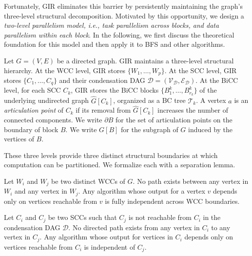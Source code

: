 Fortunately, GIR eliminates this barrier by persistently maintaining the graph's three-level structural decomposition.
Motivated by this opportunity, we design a \textit{{two-level parallelism model, i.e., task parallelism across blocks, and data parallelism within each block}}.
In the following, we first discuss the theoretical foundation for this model and then apply it to BFS and other algorithms.



Let $G = (V, E)$ be a directed graph.
GIR maintains a three-level structural hierarchy.
At the WCC level, GIR stores  $\{W_1, \ldots, W_p\}$.
At the SCC level, GIR stores $\{C_1, \ldots, C_q\}$
and their condensation DAG $\mathcal{D} = (\mathcal{V}_{\mathcal{D}}, \mathcal{E}_{\mathcal{D}})$.
At the BiCC level, for each SCC $C_k$,
GIR stores the BiCC blocks $\{B_1^k, \ldots, B_{r_k}^k\}$
of the underlying undirected graph $\hat{G}[C_k]$,
organized as a BC tree $\mathcal{T}_k$.
A vertex $a$ is an \textit{articulation point} of $C_k$
if its removal from $\hat{G}[C_k]$ increases the number of connected components.
We write $\partial B$ for the set of articulation points on the boundary of block $B$.
We write $G[B]$ for the subgraph of $G$ induced by the vertices of $B$.

These three levels provide three distinct structural boundaries at which
computation can be partitioned. We formalize each with a separation lemma.

\begin{lemma}
\label{lemma:wcc_sep}
Let $W_i$ and $W_j$ be two distinct WCCs of $G$.
No path exists between any vertex in $W_i$ and any vertex in $W_j$.
Any algorithm whose output for a vertex $v$ depends only on vertices
reachable from $v$ is fully independent across WCC boundaries.
\end{lemma}

\begin{lemma}
\label{lemma:scc_sep}
Let $C_i$ and $C_j$ be two SCCs such that $C_j$ is not reachable from $C_i$
in the condensation DAG $\mathcal{D}$.
No directed path exists from any vertex in $C_i$ to any vertex in $C_j$.
Any algorithm whose output for vertices in $C_i$ depends only on vertices
reachable from $C_i$ is independent of $C_j$.
\end{lemma}


